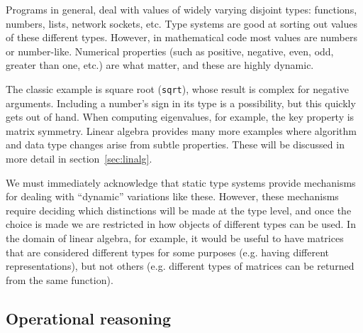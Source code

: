 {Programs in general, deal with values of widely varying disjoint types:
functions, numbers, lists, network sockets, etc.
Type systems are good at sorting out values of these different types.
However, in mathematical code most values are numbers or number-like.
Numerical properties (such as positive, negative, even, odd, greater
than one, etc.) are what matter, and these are highly dynamic.

The classic example is square root (\texttt{sqrt}), whose result is complex
for negative arguments.
Including a number's sign in its type is a possibility, but this quickly gets
out of hand.
When computing eigenvalues, for example, the key property is matrix
symmetry.
Linear algebra provides many more examples where algorithm and data type
changes arise from subtle properties. These will be discussed in more
detail in section~\ref{sec:linalg}.

We must immediately acknowledge that static type systems provide
mechanisms for dealing with ``dynamic'' variations like these.
However, these mechanisms require deciding which distinctions
will be made at the type level, and once the choice is made
we are restricted in how objects of different types can be used.
In the domain of linear algebra, for example, it would be useful
to have matrices that are considered different types for some
purposes (e.g. having different representations), but not others
(e.g. different types of matrices can be returned from the same
function).




\subsection{Operational reasoning}



}
